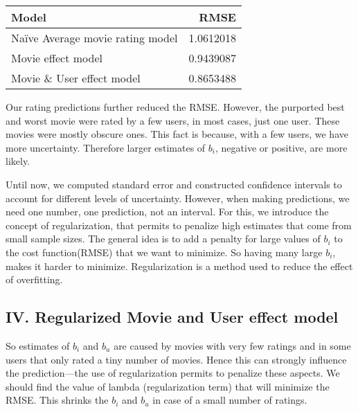 \documentclass[
]{article}
\begin{document}
\begin{longtable}[]{@{}lr@{}}
\toprule
Model & RMSE\tabularnewline
\midrule
\endhead
Naïve Average movie rating model & 1.0612018\tabularnewline
Movie effect model & 0.9439087\tabularnewline
Movie \& User effect model & 0.8653488\tabularnewline
\bottomrule
\end{longtable}

\pagebreak

Our rating predictions further reduced the RMSE. However, the purported
best and worst movie were rated by a few users, in most cases, just one
user. These movies were mostly obscure ones. This fact is because, with
a few users, we have more uncertainty. Therefore larger estimates of
\(b_{i}\), negative or positive, are more likely.

Until now, we computed standard error and constructed confidence
intervals to account for different levels of uncertainty. However, when
making predictions, we need one number, one prediction, not an interval.
For this, we introduce the concept of regularization, that permits to
penalize high estimates that come from small sample sizes. The general
idea is to add a penalty for large values of \(b_{i}\) to the cost
function(RMSE) that we want to minimize. So having many large \(b_{i}\),
makes it harder to minimize. Regularization is a method used to reduce
the effect of overfitting.

\hypertarget{iv.-regularized-movie-and-user-effect-model}{%
\subsection{IV. Regularized Movie and User effect
model}\label{iv.-regularized-movie-and-user-effect-model}}

So estimates of \(b_{i}\) and \(b_{u}\) are caused by movies with very
few ratings and in some users that only rated a tiny number of movies.
Hence this can strongly influence the prediction---the use of
regularization permits to penalize these aspects. We should find the
value of lambda (regularization term) that will minimize the RMSE. This
shrinks the \(b_{i}\) and \(b_{u}\) in case of a small number of
ratings.
\end{document}
